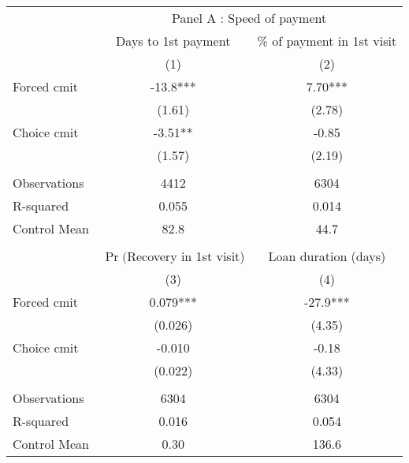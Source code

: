 \begin{tabular}{lcc}
\toprule
      & \multicolumn{2}{c}{Panel A  : Speed of payment} \\
\cmidrule{2-3}      & Days to 1st payment & \% of payment in 1st visit \\
\midrule
\midrule
      & (1)   & (2) \\
\midrule
\midrule
Forced cmit & -13.8*** & 7.70*** \\
      & (1.61) & (2.78) \\
Choice cmit & -3.51** & -0.85 \\
      & (1.57) & (2.19) \\
      &       &  \\
\midrule
Observations & 4412  & 6304 \\
R-squared & 0.055 & 0.014 \\
Control Mean & 82.8  & 44.7 \\
\midrule
\midrule
      &       &  \\
\midrule
      & $\Pr($Recovery in 1st visit) & Loan duration (days) \\
\midrule
\midrule
      & (3)   & (4) \\
\midrule
\midrule
Forced cmit & 0.079*** & -27.9*** \\
      & (0.026) & (4.35) \\
Choice cmit & -0.010 & -0.18 \\
      & (0.022) & (4.33) \\
      &       &  \\
\midrule
Observations & 6304  & 6304 \\
R-squared & 0.016 & 0.054 \\
Control Mean & 0.30  & 136.6 \\
\bottomrule
\bottomrule
\end{tabular}%
